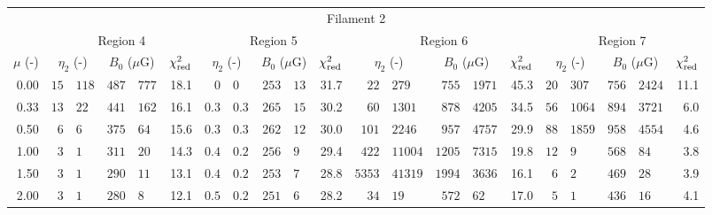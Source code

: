\begin{tabular}{@{}r r@{ $\pm$ }lr@{ $\pm$ }lr
                     r@{ $\pm$ }lr@{ $\pm$ }lr
                     r@{ $\pm$ }lr@{ $\pm$ }lr
                     r@{ $\pm$ }lr@{ $\pm$ }lr@{}}
\midrule
\multicolumn{21}{c}{Filament 2} \\
\cmidrule{1-21}
{} & \multicolumn{5}{c}{Region 4}
   & \multicolumn{5}{c}{Region 5}
   & \multicolumn{5}{c}{Region 6}
   & \multicolumn{5}{c}{Region 7} \\
\cmidrule(lr){2-6} \cmidrule(lr){7-11} \cmidrule(lr){12-16} \cmidrule(l){17-21}
$\mu$ (-) & \multicolumn{2}{c}{$\eta_2$ (-)}
          & \multicolumn{2}{c}{$B_0$ ($\mu$G)} & $\chi^2_{\mathrm{red}}$
          & \multicolumn{2}{c}{$\eta_2$ (-)}
          & \multicolumn{2}{c}{$B_0$ ($\mu$G)} & $\chi^2_{\mathrm{red}}$
          & \multicolumn{2}{c}{$\eta_2$ (-)}
          & \multicolumn{2}{c}{$B_0$ ($\mu$G)} & $\chi^2_{\mathrm{red}}$
          & \multicolumn{2}{c}{$\eta_2$ (-)}
          & \multicolumn{2}{c}{$B_0$ ($\mu$G)} & $\chi^2_{\mathrm{red}}$ \\
\cmidrule{1-21}
0.00 & $15$ & $118$ & $487$ & $777$ & 18.1
     & $0$ & $0$ & $253$ & $13$ & 31.7
     & $22$ & $279$ & $755$ & $1971$ & 45.3
     & $20$ & $307$ & $756$ & $2424$ & 11.1 \\
0.33 & $13$ & $22$ & $441$ & $162$ & 16.1
     & $0.3$ & $0.3$ & $265$ & $15$ & 30.2
     & $60$ & $1301$ & $878$ & $4205$ & 34.5
     & $56$ & $1064$ & $894$ & $3721$ & 6.0 \\
0.50 & $6$ & $6$ & $375$ & $64$ & 15.6
     & $0.3$ & $0.3$ & $262$ & $12$ & 30.0
     & $101$ & $2246$ & $957$ & $4757$ & 29.9
     & $88$ & $1859$ & $958$ & $4554$ & 4.6 \\
1.00 & $3$ & $1$ & $311$ & $20$ & 14.3
     & $0.4$ & $0.2$ & $256$ & $9$ & 29.4
     & $422$ & $11004$ & $1205$ & $7315$ & 19.8
     & $12$ & $9$ & $568$ & $84$ & 3.8 \\
1.50 & $3$ & $1$ & $290$ & $11$ & 13.1
     & $0.4$ & $0.2$ & $253$ & $7$ & 28.8
     & $5353$ & $41319$ & $1994$ & $3636$ & 16.1
     & $6$ & $2$ & $469$ & $28$ & 3.9 \\
2.00 & $3$ & $1$ & $280$ & $8$ & 12.1
     & $0.5$ & $0.2$ & $251$ & $6$ & 28.2
     & $34$ & $19$ & $572$ & $62$ & 17.0
     & $5$ & $1$ & $436$ & $16$ & 4.1 \\


\end{tabular}

